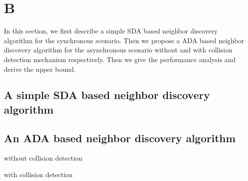 \section{B}

In this section, we first describe a simple SDA based neighbor discovery 
algorithm for the synchronous scenario. 
Then we propose a ADA based neighbor discovery algorithm for the 
asynchronous scenario without and with collision detection mechanism respectively. 
Then we give the performance  analysis and derive the upper bound.

\subsection{A simple SDA based neighbor discovery algorithm}


\subsection{An ADA based neighbor discovery algorithm}

without collision detection

with collision detection